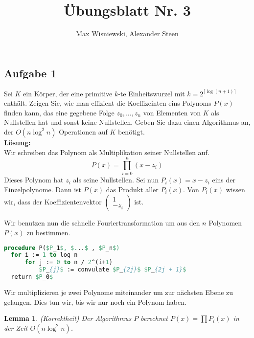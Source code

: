 \documentclass[11pt,a4paper,ngerman]{article}
\date{}
\title{Übungsblatt Nr. 3}
\author{Max Wisniewski, Alexander Steen}
\newtheorem{lemma}{\bfseries Lemma}
\begin{document}
\renewcommand{\figurename}{Figure}
\maketitle
\thispagestyle{fancy}

\subsection*{Aufgabe 1}

Sei $K$ ein Körper, der eine primitive $k$-te Einheitswurzel mit $k=2^{\lceil \log (n+1) \rceil}$ enthält. Zeigen Sie, wie man effizient die Koeffizeinten eins Polynoms $P(x)$ finden kann, das eine gegebene Folge $z_0,...,z_n$ von Elementen von $K$ als Nullstellen hat und sonst keine Nullstellen. Geben Sie dazu einen Algorithmus an, der $O(n\log^2 n)$ Operationen auf $K$ benötigt.\\

\textbf{Lösung:}\\

Wir schreiben das Polynom als Multiplikation seiner Nullstellen auf.
\begin{equation}
    P(x) = \underset{i=0}{\overset{n}{\prod}} (x-z_i)
\end{equation}
Dieses Polynom hat $z_i$ als seine Nullstellen. Sei nun
$P_{i}(x) = x-z_i$ eins der Einzelpolynome. Dann ist $P(x)$ das Produkt aller $P_i(x)$.
Von $P_i(x)$ wissen wir, dass der Koeffizientenvektor $\left( \begin{array}{c}1\\-z_i\end{array}\right)$ ist.

Wir benutzen nun die schnelle Fouriertransformation um aus den $n$ Polynomen $P(x)$ zu bestimmen.

\begin{lstlisting}[language=Pascal, mathescape=true]
procedure P($P_1$, $...$ , $P_n$)
  for i := 1 to log n
      for j := 0 to n / 2^(i+1)
          $P_{j}$ := convulate $P_{2j}$ $P_{2j + 1}$
  return $P_0$
\end{lstlisting}

Wir multiplizieren je zwei Polynome miteinander um zur nächsten Ebene zu gelangen. Dies tun wir, bis wir nur noch ein Polynom
haben.
\begin{lemma}\label{ha2:ueb3:poly} (Korrektheit)
    Der Algorithmus $P$ berechnet $P(x) = \prod P_i(x)$ in der Zeit $O(n \log^2 n)$.
\end{lemma}
\end{document}
